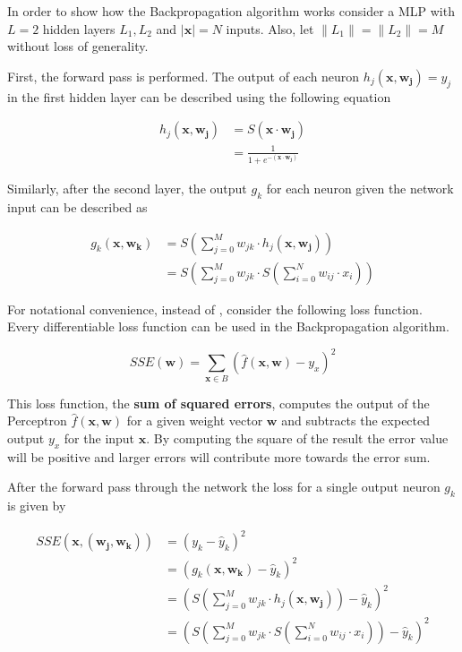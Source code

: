In order to show how the Backpropagation algorithm works consider a MLP with $L=2$ hidden layers $L_1, L_2$ and $\left| \bm{x} \right| = N$ inputs.
Also, let $\lVert L_1 \rVert = \lVert L_2 \rVert = M$ without loss of generality.

First, the forward pass is performed.
The output of each neuron $h_j(\bm{x}, \bm{w_j}) = y_j$ in the first hidden layer can be described using the following equation

\begin{equation}
    \begin{split}
        h_j(\bm{x}, \bm{w_j})
        &= S(\bm{x} \cdot \bm{w_j}) \\
        &= \frac{1}{1 + e^{-(\bm{x} \cdot \bm{w_j})}}
    \end{split}
\end{equation}

Similarly, after the second layer, the output $g_k$ for each neuron given the network input can be described as

\begin{equation}
    \begin{split}
        g_k(\bm{x}, \bm{w_k})
        &= S\left(\sum_{j=0}^M w_{jk} \cdot h_j(\bm{x}, \bm{w_j})\right) \\
        &= S\left(\sum_{j=0}^M w_{jk} \cdot S \left(\sum_{i=0}^N w_{ij} \cdot x_i\right)\right)
    \end{split}
\end{equation}

For notational convenience, instead of , consider the following loss function.
Every differentiable loss function can be used in the Backpropagation algorithm.

\begin{equation}
    SSE(\bm{w}) = \sum_{\bm{x} \in B} (\hat{f}(\bm{x}, \bm{w}) - y_x)^2
\end{equation}

This loss function, the \textbf{sum of squared errors}, computes the output of the Perceptron $\hat{f}(\bm{x}, \bm{w})$ for a given weight vector $\bm{w}$ and subtracts the expected output $y_x$ for the input $\bm{x}$.
By computing the square of the result the error value will be positive and larger errors will contribute more towards the error sum.

After the forward pass through the network the loss for a single output neuron $g_k$ is given by

\begin{equation}
    \begin{split}
        SSE(\bm{x}, (\bm{w_j}, \bm{w_k}))
        &= (y_k - \hat{y}_{k})^2 \\
        &= (g_k(\bm{x},\bm{w_k}) - \hat{y}_{k})^2 \\
        &= \left(S \left(\sum_{j=0}^M w_{jk} \cdot h_j(\bm{x}, \bm{w_j})\right) - \hat{y}_{k}\right)^2 \\
        &=  \left( S\left(\sum_{j=0}^M w_{jk} \cdot S \left(\sum_{i=0}^N w_{ij} \cdot x_i\right)\right) - \hat{y}_{k}\right)^2
    \end{split}
\end{equation}

